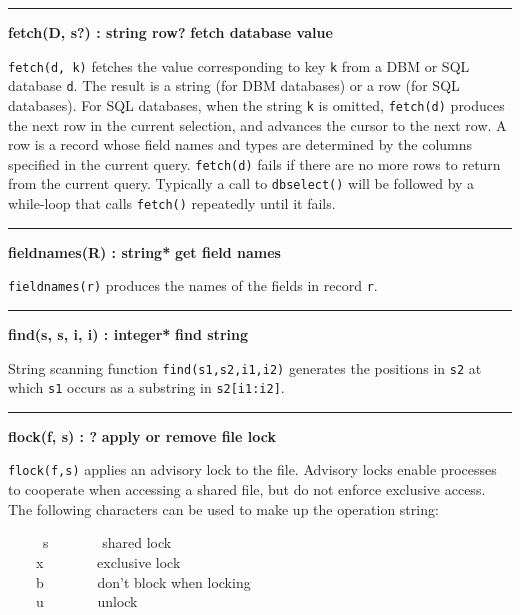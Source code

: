 \bigskip\hrule\vspace{0.1cm}
\noindent
{\bf fetch(D, s?) : string {\textbar} row? } \hfill {\bf fetch database value}

\noindent
{}\texttt{fetch(d, k)} fetches the value
corresponding to key \texttt{k} from a DBM or
SQL database \texttt{d}. The result is
a string (for DBM databases) or a row (for SQL databases). For SQL
databases, when the string \texttt{k} is omitted,
\texttt{fetch(d)} produces the next row \WarningNotThreadSafe
in the current selection, and advances the cursor to the next row. A
row is a record whose field names and types are determined by the
columns specified in the current query. \texttt{fetch(d)} fails if there are no
more rows to return from the current query. Typically a call to
\texttt{dbselect()} will be followed by a while{}-loop that calls
\texttt{fetch()} repeatedly until it fails.

\bigskip\hrule\vspace{0.1cm}
\noindent
{\bf fieldnames(R) : string* } \hfill {\bf get field names}

\noindent
{}\texttt{fieldnames(r)} produces the names of the fields in
record \texttt{r}.

\bigskip\hrule\vspace{0.1cm}
\noindent
{\bf find(s, s, i, i) : integer* } \hfill {\bf find string}

\noindent
{}String scanning function \texttt{find(s1,s2,i1,i2)} generates
the positions in \texttt{s2} at which \texttt{s1} occurs as a
substring in \texttt{s2[i1:i2]}.

\bigskip\hrule\vspace{0.1cm}
\noindent
{\bf flock(f, s) : ? } \hfill {\bf apply or remove file lock}\WarningNotThreadSafe

\noindent
{}\texttt{flock(f,s)} applies an advisory
lock to the file. Advisory locks enable processes to
cooperate when accessing a shared file, but do not enforce exclusive
access. The following characters can be used to make up the operation
string: 

\ \ \ \ \ s \ \ \ \ \ \ \ shared lock\\
 \ \ \ \ x \ \ \ \ \ \ \ exclusive lock\\
 \ \ \ \ b \ \ \ \ \ \ \ don't block when
locking\\
 \ \ \ \ u \ \ \ \ \ \ \ unlock 

